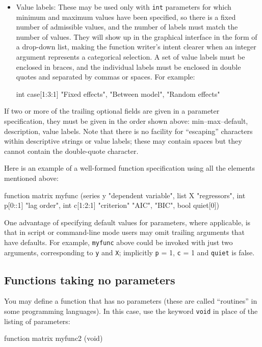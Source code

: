 \begin{itemize}
\item Value labels: These may be used only with \texttt{int}
  parameters for which minimum and maximum values have been specified,
  so there is a fixed number of admissible values, and the number of
  labels must match the number of values. They will show up in the
  graphical interface in the form of a drop-down list, making the
  function writer's intent clearer when an integer argument represents
  a categorical selection. A set of value labels must be enclosed in
  braces, and the individual labels must be enclosed in double quotes
  and separated by commas or spaces.  For example:
%
\begin{code}
int case[1:3:1] {"Fixed effects", "Between model", "Random effects"}
\end{code} 

\end{itemize}

If two or more of the trailing optional fields are given in a
parameter specification, they must be given in the order shown above:
min--max--default, description, value labels. Note that there is no
facility for ``escaping'' characters within descriptive strings or
value labels; these may contain spaces but they cannot contain the
double-quote character.  

Here is an example of a well-formed function specification using all
the elements mentioned above:
%
\begin{code}
function matrix myfunc (series y "dependent variable",
                        list X "regressors",
                        int p[0::1] "lag order",
                        int c[1:2:1] "criterion" {"AIC", "BIC"},
                        bool quiet[0])
\end{code} 

One advantage of specifying default values for parameters, where
applicable, is that in script or command-line mode users may omit
trailing arguments that have defaults. For example, \texttt{myfunc}
above could be invoked with just two arguments, corresponding to
\texttt{y} and \texttt{X}; implicitly \texttt{p} = 1, \texttt{c} = 1
and \texttt{quiet} is false.

\subsection{Functions taking no parameters}

You may define a function that has no parameters (these are called
``routines'' in some programming languages).  In this case,  
use the keyword \texttt{void} in place of the listing of parameters:
%    
\begin{code}
function matrix myfunc2 (void)
\end{code}


